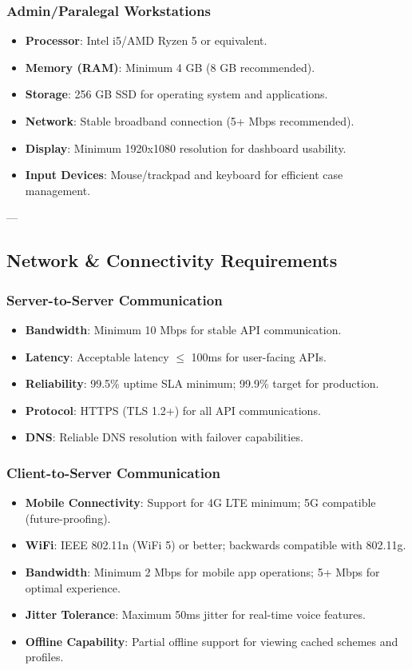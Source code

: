 \subsubsection{Admin/Paralegal Workstations}
\begin{itemize}
    \item \textbf{Processor}: Intel i5/AMD Ryzen 5 or equivalent.
    \item \textbf{Memory (RAM)}: Minimum 4 GB (8 GB recommended).
    \item \textbf{Storage}: 256 GB SSD for operating system and applications.
    \item \textbf{Network}: Stable broadband connection (5+ Mbps recommended).
    \item \textbf{Display}: Minimum 1920x1080 resolution for dashboard usability.
    \item \textbf{Input Devices}: Mouse/trackpad and keyboard for efficient case management.
\end{itemize}

---

\subsection{Network \& Connectivity Requirements}

\subsubsection{Server-to-Server Communication}
\begin{itemize}
    \item \textbf{Bandwidth}: Minimum 10 Mbps for stable API communication.
    \item \textbf{Latency}: Acceptable latency $\leq$ 100ms for user-facing APIs.
    \item \textbf{Reliability}: 99.5\% uptime SLA minimum; 99.9\% target for production.
    \item \textbf{Protocol}: HTTPS (TLS 1.2+) for all API communications.
    \item \textbf{DNS}: Reliable DNS resolution with failover capabilities.
\end{itemize}

\subsubsection{Client-to-Server Communication}
\begin{itemize}
    \item \textbf{Mobile Connectivity}: Support for 4G LTE minimum; 5G compatible (future-proofing).
    \item \textbf{WiFi}: IEEE 802.11n (WiFi 5) or better; backwards compatible with 802.11g.
    \item \textbf{Bandwidth}: Minimum 2 Mbps for mobile app operations; 5+ Mbps for optimal experience.
    \item \textbf{Jitter Tolerance}: Maximum 50ms jitter for real-time voice features.
    \item \textbf{Offline Capability}: Partial offline support for viewing cached schemes and profiles.
\end{itemize}

